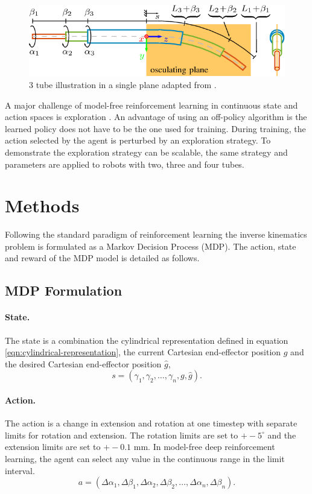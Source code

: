 \begin{figure}
  \includegraphics[width=\linewidth]{2-Figure2-1.png}
\caption{3 tube illustration in a single plane adapted from \cite{Grassmann2018}.}
\label{fig:constraints}
\end{figure}

A major challenge of model-free reinforcement learning in continuous state and action spaces is exploration \cite{Nair2018}. An advantage of using an off-policy algorithm is the learned policy does not have to be the one used for training. During training, the action selected by the agent is perturbed by an exploration strategy. To demonstrate the exploration strategy can be scalable, the same strategy and parameters are applied to robots with two, three and four tubes.
\section{Methods}
Following the standard paradigm of reinforcement learning the inverse kinematics problem is formulated as a Markov Decision Process (MDP). The action, state and reward of the MDP model is detailed as follows.
\subsection{MDP Formulation}
\paragraph{State.} The state is a combination the cylindrical representation defined in equation \ref{eqn:cylindrical-representation}, the current Cartesian end-effector position $g$ and the desired Cartesian end-effector position $\hat{g}$,
\begin{equation}
s = \left( \gamma_1, \gamma_2, \dots, \gamma_n, g, \hat{g} \right). \label{eqn:state}
\end{equation}

\paragraph{Action.} The action is a change in extension and rotation at one timestep with separate limits for rotation and extension. The rotation limits are set to $+- 5^\circ$ and the extension limits are set to $+- 0.1$ mm. In model-free deep reinforcement learning, the agent can select any value in the continuous range in the limit interval.
\begin{equation}
a = \left( \Delta \alpha_1, \Delta \beta_1, \Delta \alpha_2, \Delta \beta_2,  \dots, \Delta \alpha_n, \Delta \beta_n \right). \label{eqn:action-definition}
\end{equation}

